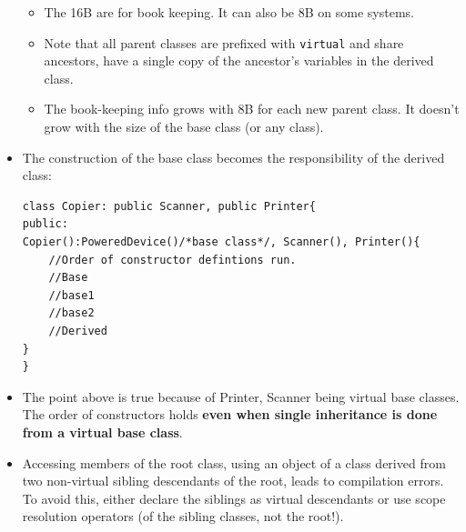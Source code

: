 \documentclass{report}
\begin{document}
\begin{itemize}
\begin{itemize}
    \item The 16B are for book keeping. It can also be 8B on some systems.
    \item Note that all parent classes are prefixed with \texttt{virtual} and share ancestors, have a single copy of the ancestor's variables in the derived class.
    \item The book-keeping info grows with 8B for each new parent class. It doesn't grow with the size of the base class (or any class).
\end{itemize}
\item The construction of the base class becomes the responsibility of the derived class:
\begin{lstlisting}
class Copier: public Scanner, public Printer{
public:
Copier():PoweredDevice()/*base class*/, Scanner(), Printer(){
    //Order of constructor defintions run.
    //Base
    //base1
    //base2
    //Derived
}
}
\end{lstlisting}
\item The point above is true because of Printer, Scanner being virtual base classes. The order of constructors holds \textbf{even when single inheritance is done from a virtual base class}.

\item Accessing members of the root class, using an object of a class derived from two non-virtual sibling descendants of the root, leads to compilation errors. To avoid this, either declare the siblings as virtual descendants or use scope resolution operators (of the sibling classes, not the root!).
\end{itemize}
\end{document}
